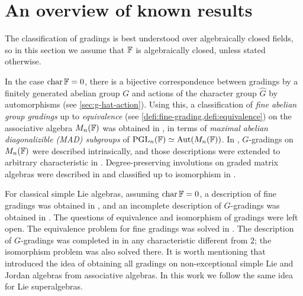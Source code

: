 
\section{An overview of known results}

The classification of gradings is best understood over algebraically closed fields, so in this section we assume that $\mathbb{F}$ is algebraically closed, unless stated otherwise. 

\label{intro-equiv}

In the case $\operatorname{char} \mathbb{F} = 0$, there is a bijective correspondence between gradings by a finitely generated abelian group $G$ and actions of the character group $\widehat G$ by automorphisms (see \cref{sec:g-hat-action}). 
Using this, a classification of \emph{fine abelian group gradings} up to \emph{equivalence} (see \cref{defi:fine-grading,defi:equivalence}) on the associative algebra $M_n(\mathbb{F})$ was obtained in \cite{HPP}, in terms of \emph{maximal abelian diagonalizible (MAD) subgroups} of $\operatorname{PGL}_n(\mathbb{F}) \simeq \operatorname{Aut}( M_n(\mathbb{F}) )$. 
In \cite{BSZ01, BZ02}, $G$-gradings on $M_n(\mathbb{F})$ were described intrinsically, and those descriptions were extended to arbitrary characteristic in \cite{BZ03}.
Degree-preserving involutions on graded matrix algebras were described in \cite{BZ07, BG08a} and classified up to isomorphism in \cite{BK10}. 

For classical simple Lie algebras, 
assuming $\operatorname{char} \mathbb{F} = 0$, a description of fine gradings was obtained in \cite{HPP}, and an incomplete description of $G$-gradings was obtained in \cite{BSZ05,BZ06}. 
The questions of equivalence and isomorphism of gradings were left open. 
The equivalence problem for fine gradings was solved in \cite{Eld10}. 
The description of $G$-gradings was completed in \cite{BK10} in any characteristic different from $2$; the isomorphism problem was also solved there. 
It is worth mentioning that \cite{BSZ05} introduced the idea of obtaining all gradings on non-exceptional simple Lie and Jordan algebras from associative algebras. 
In this work we follow the same idea for Lie superalgebras. 

